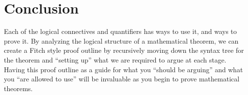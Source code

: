 \section{Conclusion}

Each of the logical connectives and quantifiers has ways to use it, and ways to prove it.  By analyzing the logical structure of a mathematical theorem, we can create a Fitch style proof outline by recursively moving down the syntax tree for the theorem and ``setting up'' what we are required to argue at each stage.  Having this proof outline as a guide for what you ``should be arguing'' and what you ``are allowed to use'' will be invaluable as you begin to prove mathematical theorems.








